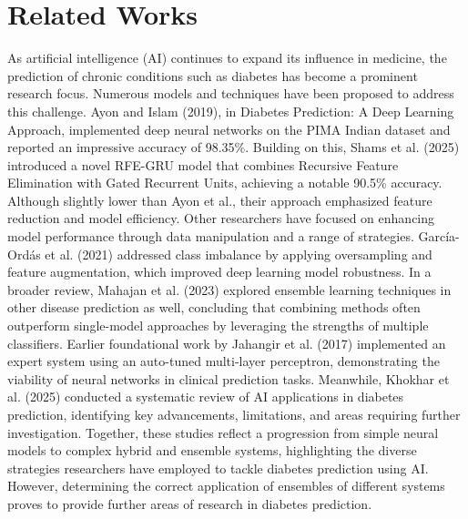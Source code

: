 \section{Related Works}

​​As artificial intelligence (AI) continues to expand its influence in medicine, the prediction of chronic conditions such as diabetes has become a prominent research focus. Numerous models and techniques have been proposed to address this challenge.
Ayon and Islam (2019), in Diabetes Prediction: A Deep Learning Approach, implemented deep neural networks on the PIMA Indian dataset and reported an impressive accuracy of 98.35\%. Building on this, Shams et al. (2025) introduced a novel RFE-GRU model that combines Recursive Feature Elimination with Gated Recurrent Units, achieving a notable 90.5\% accuracy. Although slightly lower than Ayon et al., their approach emphasized feature reduction and model efficiency.
Other researchers have focused on enhancing model performance through data manipulation and a range of strategies. García-Ordás et al. (2021) addressed class imbalance by applying oversampling and feature augmentation, which improved deep learning model robustness. In a broader review, Mahajan et al. (2023) explored ensemble learning techniques in other disease prediction as well, concluding that combining methods often outperform single-model approaches by leveraging the strengths of multiple classifiers.
Earlier foundational work by Jahangir et al. (2017) implemented an expert system using an auto-tuned multi-layer perceptron, demonstrating the viability of neural networks in clinical prediction tasks. Meanwhile, Khokhar et al. (2025) conducted a systematic review of AI applications in diabetes prediction, identifying key advancements, limitations, and areas requiring further investigation.
Together, these studies reflect a progression from simple neural models to complex hybrid and ensemble systems, highlighting the diverse strategies researchers have employed to tackle diabetes prediction using AI. However, determining the correct application of ensembles of different systems proves to provide further areas of research in diabetes prediction. 
